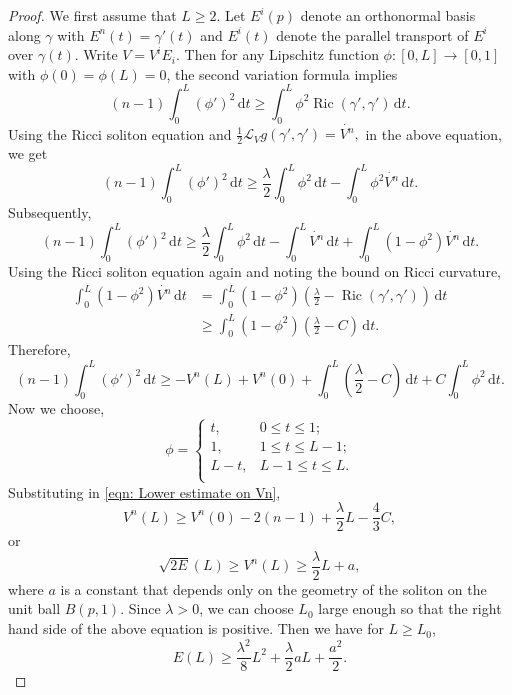 \documentclass{amsart}
\newcommand{\lie}[1]{\mathcal{L}_{#1}}
\newcommand{\derivative}{\mathrm{d}}
\DeclareMathOperator*{\ricci}{Ric}
\theoremstyle{plain}
\theoremstyle{plain}
\theoremstyle{plain}
\theoremstyle{plain}
\theoremstyle{remark}
\begin{document}
\begin{proof}
	We first assume that $L\geq 2$.
	Let $E^{i}(p)$ denote an orthonormal basis along $\gamma$ with $E^n(t) = {\gamma}'(t)$ and 
   $E^{i}(t)$  denote  the parallel transport of $E^i$ over $\gamma(t)$.  Write
$V = V^i E_i$. Then for any Lipschitz function $\phi:[0,L] \to [0,1]$ with $\phi(0) = \phi(L)=0$, the second variation formula implies
	$$ (n-1) \int_0^L (\phi ' )^2 \, \derivative t 
		\geq \int_0^L \phi^2 \ricci (\gamma' , \gamma ' ) \, \derivative t. $$
	 Using the Ricci soliton equation and 
	$ \frac{1}{2} \lie{V} g (\gamma' , \gamma ' ) = \dot{V^n}, $
	in the above equation, we get
	$$ (n-1) \int_0^L (\phi ' )^2 \, \derivative t 
		\geq \frac{\lambda}{2} \int_0^L \phi^2 \, \derivative t 
		- \int_0^L \phi^2 \dot{V^n} \, \derivative t  . $$
	Subsequently,
	$$ (n-1) \int_0^L (\phi ' )^2 \, \derivative t 
		\geq \frac{\lambda}{2} \int_0^L \phi^2 \, \derivative t 
		- \int_0^L \dot{V^n} \, \derivative t		
		+ \int_0^L (1-\phi^2) \dot{V^n} \, \derivative t . $$
Using  the Ricci soliton equation again and noting the bound on Ricci curvature,
	\begin{align*}
		\int_0^L \left(1-\phi^2\right) \dot{V^n} \, \derivative t &= 
		\int_0^L \left(1-\phi^2\right) \left( \frac{\lambda}{2} - \ricci \left(\gamma' , \gamma'\right) \right) \, \derivative t \\
		&\geq \int_0^L \left(1-\phi^2\right) \left( \frac{\lambda}{2} - C \right) \, \derivative t. 
	\end{align*}
	Therefore,
	\begin{equation}\label{eqn: Lower estimate on Vn}
		(n-1) \int_0^L (\phi ' )^2 \, \derivative t 
		\geq - V^n(L) + V^n(0)		
		+ \int_0^L \left( \frac{\lambda}{2} - C \right)  \, \derivative t  
		+ C \int_0^L \phi^2 \, \derivative t .
	\end{equation}
	Now we choose,
	\begin{equation*}
		\phi = 
			\begin{cases}
				t, 	& 0 \leq t \leq 1 ; \\
				1, 	& 1 \leq t \leq L-1 ; \\
				L-t, 	& L-1 \leq t \leq L. \\
			\end{cases} 
	\end{equation*}
	Substituting in \cref{eqn: Lower estimate on Vn},
	$$ V^n (L) \geq V^n (0) - 2 (n-1) +\frac{\lambda}{2} L - \frac{4}{3} C , $$
	or
	$$ \sqrt{2E} (L) \geq V^n(L) \geq \frac{\lambda}{2} L + a, $$
	where $a$ is a constant that depends only on the geometry of the soliton on the unit ball $B(p,1)$. Since $\lambda>0$, we can choose $L_0$ large enough so that the right hand side of the above equation is positive. Then  we have for $L\geq L_0$, 
	$$ E (L) \geq \frac{\lambda^2}{8}L^2 + \frac{\lambda}{2} a L + \frac{a^2}{2}. $$
\end{proof}
\end{document}
